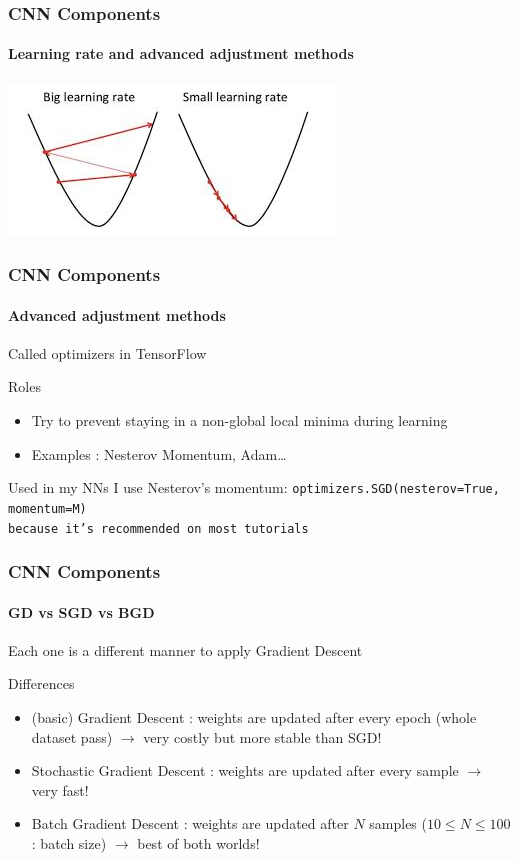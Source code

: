 \documentclass[]{beamer}
\begin{document}
\begin{frame}
  \frametitle{CNN Components}
  \framesubtitle{Learning rate and advanced adjustment methods}
  \begin{center}
    \includegraphics[width=\linewidth]{resources/big_vs_small_lr}
  \end{center}
\end{frame}

\begin{frame}
  \frametitle{CNN Components}
  \framesubtitle{Advanced adjustment methods}
  Called optimizers in \alert{TensorFlow}
  \begin{block}{Roles}
    \begin{itemize}
      \item Try to prevent staying in a non-global local minima during learning
      \item \alert{Examples} : Nesterov Momentum, Adam\ldots{}
    \end{itemize}
  \end{block}

  \begin{exampleblock}{Used in my NNs}
    I use Nesterov's momentum: \tt{optimizers.SGD(nesterov=True, momentum=M)}\\ because it's recommended on most tutorials
  \end{exampleblock}
\end{frame}

\begin{frame}
  \frametitle{CNN Components}
  \framesubtitle{GD vs SGD vs BGD}
  Each one is a different manner to apply Gradient Descent
  \begin{block}{Differences}
    \begin{itemize}
      \item \alert{(basic) Gradient Descent} : weights are updated after every epoch (whole dataset pass) $\to$ \alert{very costly} but more stable than SGD!
      \item \alert{Stochastic Gradient Descent} : weights are updated after \alert{every} sample $\to$ \alert{very fast}!
      \item \alert{Batch Gradient Descent} : weights are updated after $N$ samples ($10 \le N \le 100$: batch size) $\to$ \alert{best of both worlds!}
    \end{itemize}
  \end{block}
\end{frame}
\end{document}
